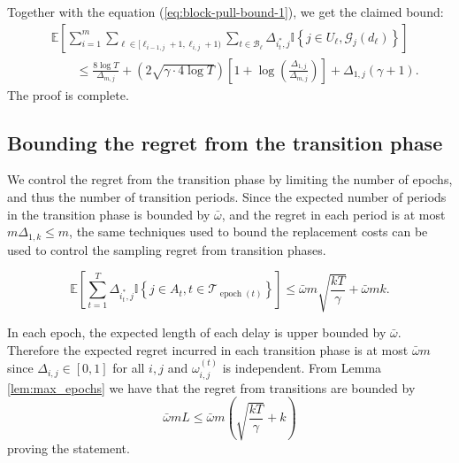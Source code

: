 \documentclass[opre,blindrev]{informs3}
\newcommand{\epoch}{\operatorname{epoch}}
\newcommand{\ind}[1]{\mathbb{I}\left\{#1\right\}}
\newcommand{\bE}[1]{{\mathbb{E}\left[#1\right]}}
\begin{document}
\begin{APPENDICES}
    Together with the equation (\ref{eq:block-pull-bound-1}), we get the claimed bound:
    \begin{align*}
        &\bE{\sum_{i=1}^m \sum_{\ell \in [\ell_{i-1,j}+1, \ell_{i,j}+1)}\sum_{t \in \mathcal{B}_\ell}\Delta_{i^*_t,j}\ind{j \in U_{\ell}, \mathcal{G}_j(d_\ell)}}
        \\
        &\qquad \leq \frac{8\log T}{\Delta_{m,j}}+\left(2\sqrt{\gamma \cdot 4\log T}\right)\left[1+\log\left(\frac{\Delta_{1,j}}{\Delta_{m,j}}\right)\right] + \Delta_{1,j}(\gamma + 1).
    \end{align*}
The proof is complete. 
\Halmos  

\subsection{Bounding the regret from the transition phase}
We control the regret from the transition phase by limiting the number of epochs, and thus the number of transition periods. Since the expected number of periods in the transition phase is bounded by \(\bar{\omega}\), and the regret in each period is at most \(m\Delta_{1,k}\leq m\), the same techniques used to bound the replacement costs can be used to control the sampling regret from transition phases. 

\begin{lemma}\label{lem:transition-regret}
    \[\bE{\sum_{t=1}^T\Delta_{i^*_t, j}\ind{j\in A_t, t\in \mathcal{T}_{\epoch(t)}}}\leq \bar{\omega}m\sqrt{\frac{kT}{\gamma}}+\bar{\omega}mk.\]
\end{lemma}
    In each epoch, the expected length of each delay is upper bounded by \(\bar{\omega}\). Therefore the expected regret incurred in each transition phase is at most \(\bar{\omega} m\) since \(\Delta_{i,j}\in [0,1]\) for all \(i,j\) and \(\omega_{i,j}^{(t)}\) is independent. From Lemma \ref{lem:max_epochs} we have that the regret from transitions are bounded by
    \[\bar{\omega}mL\leq \bar{\omega}m\left(\sqrt{\frac{kT}{\gamma}}+k\right)\]
    proving the statement.
\Halmos  


\end{APPENDICES}
\end{document}

